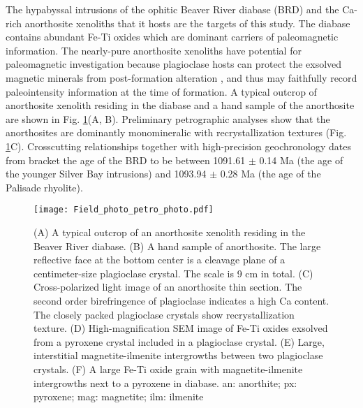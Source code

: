 \documentclass[draft]{agujournal2019}
\begin{document}

  The hypabyssal intrusions of the ophitic Beaver River diabase (BRD) and the Ca-rich anorthosite xenoliths that it hosts are the targets of this study. The diabase contains abundant Fe-Ti oxides which are dominant carriers of paleomagnetic information. The nearly-pure anorthosite xenoliths have potential for paleomagnetic investigation because plagioclase hosts can protect the exsolved magnetic minerals from post-formation alteration \citep{Tarduno2005a}, and thus may faithfully record paleointensity information at the time of formation. A typical outcrop of anorthosite xenolith residing in the diabase and a hand sample of the anorthosite are shown in Fig. \ref{fig:field}(A, B). Preliminary petrographic analyses show that the anorthosites are dominantly monomineralic with recrystallization textures (Fig. \ref{fig:field}C). Crosscutting relationships together with high-precision geochronology dates from \cite{Swanson-Hysell2019a} bracket the age of the BRD to be between 1091.61 $\pm$ 0.14 Ma  (the age of the younger Silver Bay intrusions) and 1093.94 $\pm$ 0.28 Ma  (the age of the Palisade rhyolite). 
  
\begin{figure}
\noindent\texttt{[image: Field\_photo\_petro\_photo.pdf]}
\caption{\small{(A) A typical outcrop of an anorthosite xenolith residing in the Beaver River diabase. (B) A hand sample of anorthosite. The large reflective face at the bottom center is a cleavage plane of a centimeter-size plagioclase crystal. The scale is 9 cm in total. (C) Cross-polarized light image of an anorthosite thin section. The second order birefringence of plagioclase indicates a high Ca content. The closely packed plagioclase crystals show recrystallization texture. (D) High-magnification SEM image of Fe-Ti oxides exsolved from a pyroxene crystal included in a plagioclase crystal. (E) Large, interstitial magnetite-ilmenite intergrowths between two plagioclase crystals. (F) A large Fe-Ti oxide grain with magnetite-ilmenite intergrowths next to a pyroxene in diabase. an: anorthite; px: pyroxene; mag: magnetite; ilm: ilmenite}}
\label{fig:field}
\end{figure}
\end{document}
